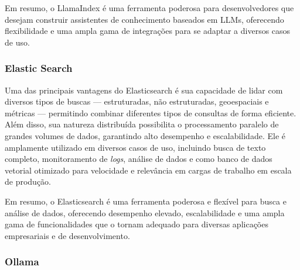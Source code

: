 \documentclass[a4paper, 12pt]{article}
\begin{document}
    Em resumo, o LlamaIndex é uma ferramenta poderosa para desenvolvedores que desejam construir assistentes de conhecimento baseados em LLMs, oferecendo flexibilidade e uma ampla gama de integrações para se adaptar a diversos casos de uso.

    \subsubsection{Elastic Search} \label{sec:elasticsearch}


    Uma das principais vantagens do Elasticsearch é sua capacidade de lidar com diversos tipos de buscas — estruturadas, não estruturadas, geoespaciais e métricas — permitindo combinar diferentes tipos de consultas de forma eficiente. Além disso, sua natureza distribuída possibilita o processamento paralelo de grandes volumes de dados, garantindo alto desempenho e escalabilidade. Ele é amplamente utilizado em diversos casos de uso, incluindo busca de texto completo, monitoramento de \textit{logs}, análise de dados e como banco de dados vetorial otimizado para velocidade e relevância em cargas de trabalho em escala de produção.

    Em resumo, o Elasticsearch é uma ferramenta poderosa e flexível para busca e análise de dados, oferecendo desempenho elevado, escalabilidade e uma ampla gama de funcionalidades que o tornam adequado para diversas aplicações empresariais e de desenvolvimento.

    \subsubsection{Ollama} \label{sec:ollama}

\end{document}
